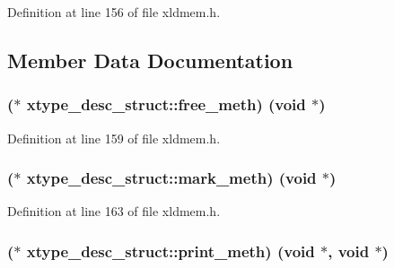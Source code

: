 Definition at line 156 of file xldmem.\+h.



\subsection{Member Data Documentation}
\subsubsection[{\texorpdfstring{free\+\_\+meth}{free_meth}}]{($\ast$ xtype\+\_\+desc\+\_\+struct\+::free\+\_\+meth) ({\bf void} $\ast$)}\hypertarget{structxtype__desc__struct_af4b02eb08915eef7642227bbf5d04031}{}\label{structxtype__desc__struct_af4b02eb08915eef7642227bbf5d04031}


Definition at line 159 of file xldmem.\+h.

\subsubsection[{\texorpdfstring{mark\+\_\+meth}{mark_meth}}]{($\ast$ xtype\+\_\+desc\+\_\+struct\+::mark\+\_\+meth) ({\bf void} $\ast$)}\hypertarget{structxtype__desc__struct_ad2a148a69083b13dae6a20eec06f978f}{}\label{structxtype__desc__struct_ad2a148a69083b13dae6a20eec06f978f}


Definition at line 163 of file xldmem.\+h.

\subsubsection[{\texorpdfstring{print\+\_\+meth}{print_meth}}]{($\ast$ xtype\+\_\+desc\+\_\+struct\+::print\+\_\+meth) ({\bf void} $\ast$, {\bf void} $\ast$)}\hypertarget{structxtype__desc__struct_a0a33189e5a8b08ec235e2b2faad8db61}{}\label{structxtype__desc__struct_a0a33189e5a8b08ec235e2b2faad8db61}


